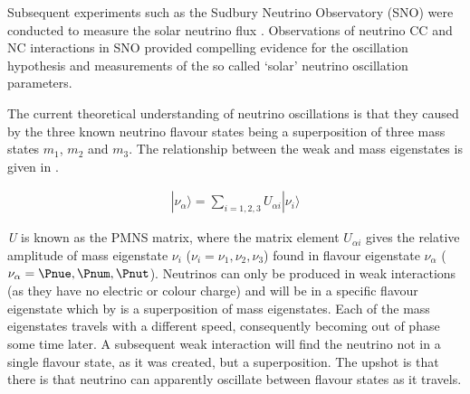 Subsequent experiments such as the Sudbury Neutrino Observatory (SNO) were conducted to measure the solar neutrino flux \cite{Ahmad:2002jz}. Observations of neutrino CC and NC interactions in SNO provided compelling evidence for the oscillation hypothesis and measurements of the so called `solar' neutrino oscillation parameters.

The current theoretical understanding of neutrino oscillations is that they caused by the three known neutrino flavour states being a superposition of three mass states \textit{$m_{1}$}, \textit{$m_{2}$} and \textit{$m_{3}$}. The relationship between the weak and mass eigenstates is given in .

\begin{gather}
  |\nu_{\alpha}\rangle = \sum\limits_{i=1,2,3}U_{\alpha i}|\nu_{i}\rangle
  \label{eq:particle-physics:neutrino-flavour-mass-relation}
\end{gather}


\textit{U} is known as the PMNS matrix, where the matrix element $U_{\alpha i}$ gives the relative amplitude of mass eigenstate $\nu_{i}$ ($\nu_{i}=\nu_{1},\nu_{2},\nu_{3}$) found in flavour eigenstate $\nu_{\alpha}$ ($\nu_{\alpha}=\Pnue,\Pnum,\Pnut$). Neutrinos can only be produced in weak interactions (as they have no electric or colour charge) and will be in a specific flavour eigenstate which by  is a superposition of mass eigenstates. Each of the mass eigenstates travels with a different speed, consequently becoming out of phase some time later. A subsequent weak interaction will find the neutrino not in a single flavour state, as it was created, but a superposition. The upshot is that there is that neutrino can apparently oscillate between flavour states as it travels. 


